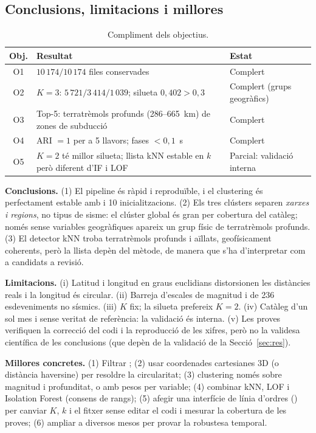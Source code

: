 \documentclass[a4paper,11pt]{article}
\providecommand{\py}[1]{\texttt{\detokenize{#1}}}
\begin{document}
\subsection{Conclusions, limitacions i millores}\label{sec:lim}
\begin{table}[H]
\centering\footnotesize
\begin{tabular}{@{}cp{9.2cm}p{4.6cm}@{}}
\toprule
Obj. & Resultat & Estat\\
\midrule
O1 & $10\,174/10\,174$ files conservades & Complert\\
O2 & $K=3$: $5\,721/3\,414/1\,039$; silueta $0{,}402>0{,}3$ & Complert (grups geogràfics)\\
O3 & Top-5: terratrèmols profunds (286--665~km) de zones de subducció & Complert\\
O4 & ARI $=1$ per a 5 llavors; fases $<0{,}1$~s & Complert\\
O5 & $K=2$ té millor silueta; llista kNN estable en $k$ però diferent d'IF i LOF & Parcial: validació interna\\
\bottomrule
\end{tabular}
\caption{Compliment dels objectius.}\label{tab:obj}
\end{table}
\textbf{Conclusions.} (1) El pipeline és ràpid i reproduïble, i el clustering és perfectament estable amb \py{k-means++} i 10 inicialitzacions. (2) Els tres clústers separen \emph{xarxes i regions}, no tipus de sisme: el clúster global és gran per cobertura del catàleg; només sense variables geogràfiques apareix un grup físic de terratrèmols profunds. (3) El detector kNN troba terratrèmols profunds i aïllats, geofísicament coherents, però la llista depèn del mètode, de manera que s'ha d'interpretar com a candidats a revisió.

\textbf{Limitacions.} (i) Latitud i longitud en graus euclidians distorsionen les distàncies reals i la longitud és circular. (ii) Barreja d'escales de magnitud i de 236 esdeveniments no sísmics. (iii) $K$ fix; la silueta prefereix $K=2$. (iv) Catàleg d'un sol mes i sense veritat de referència: la validació és interna. (v) Les proves verifiquen la correcció del codi i la reproducció de les xifres, però no la validesa científica de les conclusions (que depèn de la validació de la Secció~\ref{sec:res}).

\textbf{Millores concretes.} (1) Filtrar \py{type == "earthquake"}; (2) usar coordenades cartesianes 3D (o distància haversine) per resoldre la circularitat; (3) clustering només sobre magnitud i profunditat, o amb pesos per variable; (4) combinar kNN, LOF i Isolation Forest (consens de rangs); (5) afegir una interfície de línia d'ordres (\py{argparse}) per canviar $K$, $k$ i el fitxer sense editar el codi i mesurar la cobertura de les proves; (6) ampliar a diversos mesos per provar la robustesa temporal.
\end{document}

